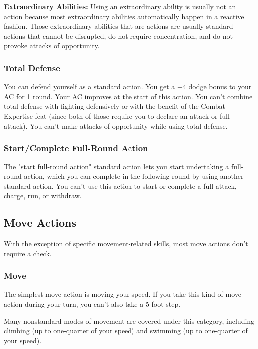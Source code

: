 \textbf{Extraordinary Abilities:} Using an extraordinary ability is usually not an action because most extraordinary abilities automatically happen in a reactive fashion. Those extraordinary abilities that are actions are usually standard actions that cannot be disrupted, do not require concentration, and do not provoke attacks of opportunity.

\subsubsection{Total Defense}

You can defend yourself as a standard action. You get a +4 dodge bonus to your AC for 1 round. Your AC improves at the start of this action. You can't combine total defense with fighting defensively or with the benefit of the Combat Expertise feat (since both of those require you to declare an attack or full attack). You can't make attacks of opportunity while using total defense.

\subsubsection{Start/Complete Full-Round Action}

The "start full-round action" standard action lets you start undertaking a full-round action, which you can complete in the following round by using another standard action. You can't use this action to start or complete a full attack, charge, run, or withdraw.

\subsection{Move Actions}

With the exception of specific movement-related skills, most move actions don't require a check.

\subsubsection{Move}

The simplest move action is moving your speed. If you take this kind of move action during your turn, you can't also take a 5-foot step.

Many nonstandard modes of movement are covered under this category, including climbing (up to one-quarter of your speed) and swimming (up to one-quarter of your speed).

